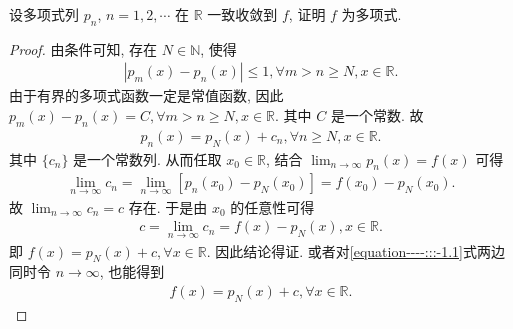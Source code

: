 \documentclass[../../main.tex]{subfiles}%
\begin{document}
\begin{example}
设多项式列 $p_n$, $n = 1,2,\cdots$ 在 $\mathbb{R}$ 一致收敛到 $f$, 证明 $f$ 为多项式. 
\end{example}
\begin{proof}
由条件可知, 存在 $N\in \mathbb{N}$, 使得
\begin{align*}
|p_m(x) - p_n(x)| \leqslant 1, \forall m > n \geqslant N, x\in \mathbb{R}.
\end{align*}
由于有界的多项式函数一定是常值函数, 因此 $p_m(x) - p_n(x) = C, \forall m > n \geqslant N, x\in \mathbb{R}$. 其中 $C$ 是一个常数. 故
\begin{align}
p_n(x) = p_N(x) + c_n, \forall n \geqslant N, x\in \mathbb{R}. \label{equation----:::-1.1}
\end{align}
其中 $\{c_n\}$ 是一个常数列. 从而任取 $x_0\in \mathbb{R}$, 结合 $\lim_{n\rightarrow \infty}p_n(x) = f(x)$ 可得
\begin{align*}
\lim_{n\rightarrow \infty}c_n = \lim_{n\rightarrow \infty}[p_n(x_0) - p_N(x_0)] = f(x_0) - p_N(x_0).
\end{align*}
故 $\lim_{n\rightarrow \infty}c_n = c$ 存在. 于是由 $x_0$ 的任意性可得
\begin{align*}
c = \lim_{n\rightarrow \infty}c_n = f(x) - p_N(x), x\in \mathbb{R}.
\end{align*}
即 $f(x) = p_N(x) + c, \forall x\in \mathbb{R}$. 因此结论得证.
或者对\eqref{equation----:::-1.1}式两边同时令 $n\rightarrow \infty$, 也能得到
\begin{align*}
f(x) = p_N(x) + c, \forall x\in \mathbb{R}.
\end{align*} \end{proof}
\end{document}
